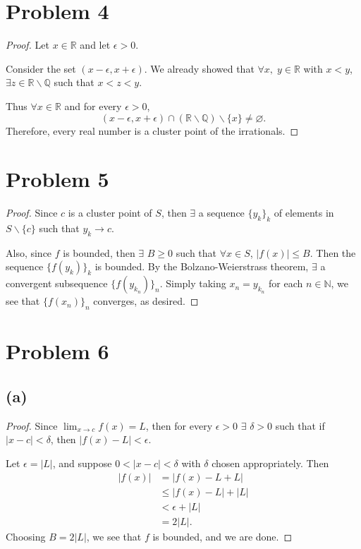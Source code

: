 \documentclass{article}
\newcommand{\R}{\mathbb{R}} %
\newcommand{\N}{\mathbb{N}} %
\newcommand{\Q}{\mathbb{Q}} %
\begin{document}
\section*{Problem 4}
\begin{proof}
	Let $x \in \R$ and let $\epsilon > 0$. 
	
	Consider the set $(x - \epsilon, x + \epsilon)$. We already showed that $\forall x,\;y \in \R$ with $x < y$, $\exists z \in \R \backslash \Q$ such that $x < z < y$.
	
	Thus $\forall x \in \R$ and for every $\epsilon > 0$,
	\begin{equation}
		(x - \epsilon, x + \epsilon) \cap (\R \backslash \Q) \backslash \{x\} \neq \varnothing.
	\end{equation}
	Therefore, every real number is a cluster point of the irrationals.
\end{proof}
\section*{Problem 5}
\begin{proof}
	Since $c$ is a cluster point of $S$, then $\exists$ a sequence $\{y_k\}_k$ of elements in $S \backslash \{c\}$ such that $y_k \to c$.
	
	Also, since $f$ is bounded, then $\exists$ $B \geq 0$ such that $\forall x \in S$, $|f(x)| \leq B$. Then the sequence $\{f(y_k)\}_k$ is bounded. By the Bolzano-Weierstrass theorem, $\exists$ a convergent subsequence $\{f(y_{k_n})\}_n$. Simply taking $x_n = y_{k_n}$ for each $n \in \N$, we see that $\{f(x_n)\}_n$ converges, as desired.
\end{proof}
\section*{Problem 6}
\subsection*{(a)}
\begin{proof}
	Since $\lim_{x \to c}f(x) = L$, then for every $\epsilon > 0$ $\exists$ $\delta > 0$ such that if \\$|x-c| < \delta$, then $|f(x) - L| < \epsilon$.
	
	Let $\epsilon = |L|$, and suppose $0 < |x-c| < \delta$ with $\delta$ chosen appropriately. Then
	\begin{align}
		|f(x)| & = |f(x) - L + L| \\
		& \leq |f(x) - L| + |L| \\
		& < \epsilon + |L| \\
		&= 2|L|.
	\end{align}
	Choosing $B = 2|L|$, we see that $f$ is bounded, and we are done.
\end{proof}
\end{document}
